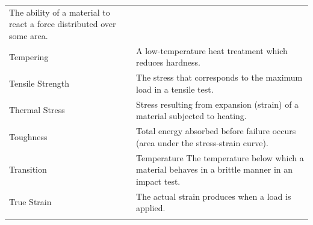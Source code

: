 \documentclass[
]{book}
\begin{document}
\begin{longtable}[]{@{}ll@{}}
\begin{minipage}[t]{0.80\columnwidth}
The ability of a material to react a force distributed over some area.\strut
\end{minipage}\tabularnewline
\begin{minipage}[t]{0.14\columnwidth}\raggedright
Tempering\strut
\end{minipage} & \begin{minipage}[t]{0.80\columnwidth}\raggedright
A low-temperature heat treatment which reduces hardness.\strut
\end{minipage}\tabularnewline
\begin{minipage}[t]{0.14\columnwidth}\raggedright
Tensile Strength\strut
\end{minipage} & \begin{minipage}[t]{0.80\columnwidth}\raggedright
The stress that corresponds to the maximum load in a tensile test.\strut
\end{minipage}\tabularnewline
\begin{minipage}[t]{0.14\columnwidth}\raggedright
Thermal Stress\strut
\end{minipage} & \begin{minipage}[t]{0.80\columnwidth}\raggedright
Stress resulting from expansion (strain) of a material subjected to heating.\strut
\end{minipage}\tabularnewline
\begin{minipage}[t]{0.14\columnwidth}\raggedright
Toughness\strut
\end{minipage} & \begin{minipage}[t]{0.80\columnwidth}\raggedright
Total energy absorbed before failure occurs (area under the stress-strain curve).\strut
\end{minipage}\tabularnewline
\begin{minipage}[t]{0.14\columnwidth}\raggedright
Transition\strut
\end{minipage} & \begin{minipage}[t]{0.80\columnwidth}\raggedright
Temperature The temperature below which a material behaves in a brittle manner in an impact test.\strut
\end{minipage}\tabularnewline
\begin{minipage}[t]{0.14\columnwidth}\raggedright
True Strain\strut
\end{minipage} & \begin{minipage}[t]{0.80\columnwidth}\raggedright
The actual strain produces when a load is applied.\strut
\end{minipage}\tabularnewline
\begin{minipage}[t]{0.14\columnwidth}\raggedright

\end{minipage}
\end{longtable}
\end{document}
